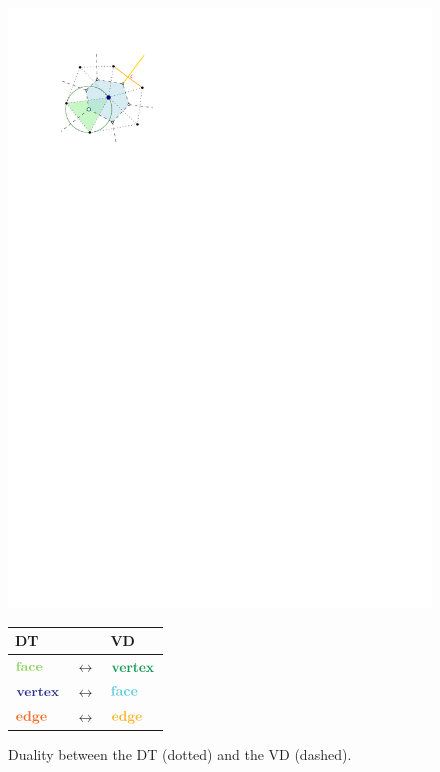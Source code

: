 \begin{figure}[ht]
\centering
\begin{minipage}[c]{0.4\textwidth}
  \includegraphics[width=\textwidth]{figs/dualdetail.pdf}
\end{minipage}
\begin{minipage}[c]{0.45\textwidth}
  \centering
  \begin{tabular}{lcl}
  \toprule
  DT & & VD \\
  \midrule
  $\mathbf{\color{YellowGreen}{face}}$ & $\leftrightarrow$ & $\mathbf{\color{ForestGreen}{vertex}}$\\
  $\mathbf{\color{Blue}{vertex}}$ & $\leftrightarrow$ & $\mathbf{\color{SkyBlue}{face}}$\\
  $\mathbf{\color{Orange}{edge}}$ & $\leftrightarrow$ & $\mathbf{\color{Dandelion}{edge}}$\\
  \bottomrule
  \end{tabular}
\end{minipage}
\caption{Duality between the DT (dotted) and the VD (dashed).}
\label{fig:dualdetailtab}
\end{figure}


